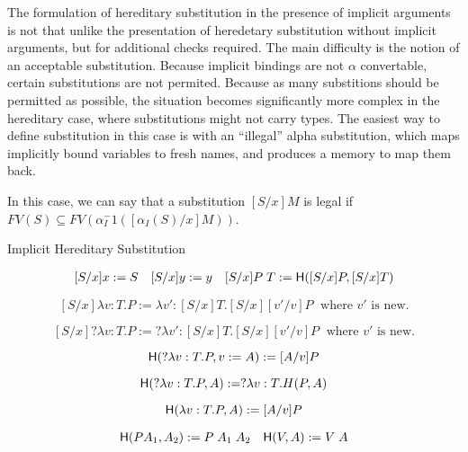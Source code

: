 The formulation of hereditary substitution in the presence of 
implicit arguments is not that unlike the presentation of
heredetary substitution without implicit arguments, 
but for additional checks required.
The main difficulty is the notion of an acceptable substitution. 
Because implicit bindings are not $\alpha$ convertable, 
certain substitutions are not permited.  
Because as many substitions should be permitted as possible, 
the situation becomes significantly more complex in the 
hereditary case, where substitutions might not carry types.  
The easiest way to define substitution in this case is with an ``illegal'' alpha substitution, 
which maps implicitly bound variables to fresh names, 
and produces a memory to map them back.

In this case, we can say that a substitution $[S/x] M$ is legal if 
$FV(S) \subseteq FV(\alpha_I^-1( [\alpha_I(S)/x] M) )$.

\begin{definition}
Implicit Hereditary Substitution

\[ \begin{array}[3]{llr}
[ S / x ] x := S
&
[S / x] y := y
&
[S / x] P\;T := \m{H}([S/x] P, [S/x]T)
\end{array} \]

\[
[S / x] \lambda v : T . P := \lambda v' : [S/x]T . [S/x][v'/v]P
\;
\text{ where $v'$ is new.}
\]

\[
[S / x] ?\lambda v : T . P := ?\lambda v' : [S/x]T . [S/x][v'/v]P
\;
\text{ where $v'$ is new.}
\]

\[ 
\mathsf{H}(?\lambda v : T . P , {v := A} ) := [A/v] P
\]

\[ 
\mathsf{H}(?\lambda v : T . P , A) := ?\lambda v : T . H(P,A)
\]

\[ 
\mathsf{H}(\lambda v : T . P , A) := [A/v] P
\]

\[ \begin{array}[2]{lr}
\m{H}(P A_1 , A_2) := P\;A_1\;A_2
&
\m{H}(V , A) := V\; A
\end{array} \]

\label{def:hered}
\end{definition}